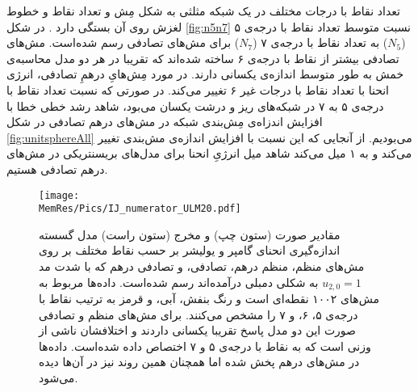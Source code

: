 تعداد نقاط با درجات مختلف در یک شبکه مثلثی به شکل مِش و تعداد نقاط  و خطوط لغزش روی آن بستگی دارد 
\cite{Nelson2000PRB}.
در شکل
\ref{fig:n5n7}
نسبت متوسط تعداد نقاط با درجه‌ی ۵ 
($N_5$)
 به تعداد نقاط با درجه‌ی ۷ 
($N_7$)
 برای مش‌های تصادفی رسم شده‌است. مش‌های تصادفی بیشتر از نقاط با درجه‌ی ۶ ساخته شده‌اند که تقریبا در هر دو مدل محاسبه‌ی خمش به طور متوسط اندازه‌ی یکسانی دارند. در مورد مِش‌هایِ درهمِ تصادفی، انرژی انحنا با تعداد نقاط با درجات غیر ۶ تغییر می‌کند. در صورتی که نسبت تعداد نقاط با درجه‌ی ۵ به ۷ در شبکه‌های ریز و درشت یکسان می‌بود، شاهد رشد خطی خطا با افزایش اندزاه‌ی مِش‌بندی شبکه‌ در مش‌های درهم تصادفی در شکل 
\ref{fig:unitsphereAll}
می‌بودیم. از آنجایی که این نسبت با افزایش اندازه‌ی مش‌بندی تغییر می‌کند و به ۱ میل می‌کند شاهد میل‌ انرژیِ انحنا برای مدل‌های بریسنتریکی در مش‌های درهم تصادفی هستیم.




\begin{figure}[htbp]
\begin{center}
\texttt{[image: \\MemRes/Pics/IJ\_numerator\_ULM20.pdf]}
\caption{
مقادیر صورت (ستون چپ) و مخرج (ستون راست) مدل گسسته اندازه‌گیری انحنای گامپر و یولیشر بر حسب نقاط مختلف بر روی مش‌های منظم، منظم درهم، تصادفی، و تصادفی درهم که با شدت مد 
$u_{2,0}=1$
به شکلی دمبلی درآمده‌اند رسم شده‌است. داده‌ها مربوط به مش‌های ۱۰۰۲ نقطه‌ای است و  رنگ بنفش، آبی، و قرمز به ترتیب  نقاط با درجه‌ی ۵، ۶، و ۷ را مشخص می‌کنند. برای مش‌های منظم و تصادفی صورت این دو مدل پاسخ تقریبا یکسانی داردند و اختلافشان ناشی از وزنی است که به نقاط با درجه‌ی ۵ و ۷ اختصاص داده شده‌است. داده‌ها در مش‌های درهم پخش شده اما همچنان همین روند نیز در آن‌ها دیده می‌شود.
}
\label{fig:ULM20BendingScatter}
\end{center}
\end{figure}

